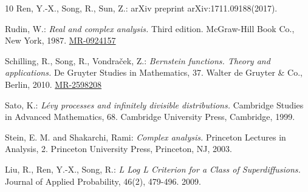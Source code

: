 \documentclass[12pt]{amsart}
\def\MR#1{\href{http://www.ams.org/mathscinet-getitem?mr=#1}{MR-#1}}
\theoremstyle{plain}
\theoremstyle{definition}
\numberwithin{equation}{section}
\begin{document}
\begin{thebibliography} {10}
Ren, Y.-X., Song, R., Sun, Z.:
 arXiv preprint arXiv:1711.09188(2017).

Rudin, W.:
\emph{Real and complex analysis.}
Third edition. McGraw-Hill Book Co., New York, 1987.
\MR{0924157}

Schilling, R., Song, R., Vondra\v{c}ek, Z.:
\emph{Bernstein functions. Theory and applications.}
De Gruyter Studies in Mathematics, 37. Walter de Gruyter \& Co., Berlin, 2010.
\MR{2598208}


Sato, K.:
\emph{Lévy processes and infinitely divisible distributions.}
Cambridge Studies in Advanced Mathematics, 68. Cambridge University Press, Cambridge, 1999.

Stein, E. M. and Shakarchi, Rami:
\emph{Complex analysis.}
Princeton Lectures in Analysis, 2. Princeton University Press, Princeton, NJ, 2003.

Liu, R.,  Ren, Y.-X., Song, R.:
\emph{ L Log L Criterion for a Class of Superdiffusions.}
Journal of Applied Probability, 46(2), 479-496. 2009.

\end{thebibliography}
\end{document}
